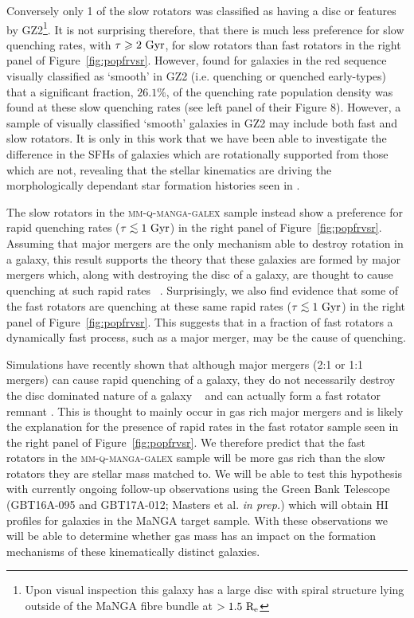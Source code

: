 \documentclass[useAMS,usenatbib]{mn2e}
\def\lesssim{\mathrel{\hbox{\rlap{\hbox{\lower3pt\hbox{$\sim$}}}\hbox{\raise2pt\hbox{$<$}}}}}
\def\refcol		{\color{refcol}}
\begin{document}
Conversely only 1 of the slow rotators was classified as having a disc or features by GZ2\footnote{Upon visual inspection this galaxy has a large disc with spiral structure lying outside of the MaNGA fibre bundle at $>1.5~\rm{R_e}$}. It is not surprising therefore, that there is much less preference for slow quenching rates, with $\tau \geq 2~\rm{Gyr}$, for slow rotators than fast rotators in the right panel of Figure~\ref{fig:popfrvsr}. However, \cite{smethurst15} found for galaxies in the red sequence visually classified as `smooth' in GZ2 (i.e. quenching or quenched early-types) that a significant fraction, $26.1\%$, of the quenching rate population density was found at these slow quenching rates (see left panel of their Figure 8). However, a sample of  visually classified `smooth' galaxies in GZ2 may include both fast and slow rotators. It is only in this work that we have been able to investigate the difference in the SFHs of galaxies which are rotationally supported from those which are not, revealing that the stellar kinematics are driving the morphologically dependant star formation histories seen in \cite{smethurst15}.

The slow rotators in the \textsc{mm-q-manga-galex} sample instead show a preference for rapid quenching rates ($\tau\lesssim1~\rm{Gyr}$) in the right panel of Figure~\ref{fig:popfrvsr}. Assuming that major mergers are the only mechanism able to destroy rotation in a galaxy, this result supports the theory that these galaxies are formed by major mergers which, along with destroying the disc of a galaxy, are thought to cause quenching at such rapid rates ~\citep{springel05b, bell06, lotz08b,lotz11}. Surprisingly, we also find evidence that some of the fast rotators are quenching at these same rapid rates ($\tau \lesssim 1~\rm{Gyr}$) in the right panel of Figure~\ref{fig:popfrvsr}. This suggests that in a fraction of fast rotators a dynamically fast process, such as a major merger, may be the cause of quenching. 

Simulations have recently shown that although major mergers (2:1 or 1:1 mergers) can cause rapid quenching of a galaxy, they do not necessarily destroy the disc dominated nature of a galaxy ~\citep{pontzen16, sparre16} and can actually form a fast rotator remnant \citep{bois11}. This is thought to mainly occur in gas rich major mergers \citep{bois11} and is likely the explanation for the presence of rapid rates in the fast rotator sample seen in the right panel of Figure~\ref{fig:popfrvsr}. We therefore predict that the fast rotators in the \textsc{mm-q-manga-galex} sample will be more gas rich than the slow rotators they are stellar mass matched to. We will be able to test this hypothesis with currently ongoing follow-up observations using the Green Bank Telescope (GBT16A-095 and GBT17A-012; {\refcol Masters et al. \emph{in prep.}}) which will obtain HI profiles for galaxies in the MaNGA target sample. With these observations we will be able to determine whether gas mass has an impact on the formation mechanisms of these kinematically distinct galaxies. 
\end{document}
